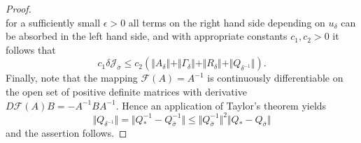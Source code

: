 \documentclass[10pt,a4paper]{amsart}
\begin{document}
\begin{proof}
\begin{equation*}
    \end{equation*}
    for a sufficiently small $\epsilon > 0$ all terms on the right hand side depending on $u_\delta$ can be absorbed in the left hand side, and with appropriate constants $c_1, c_2 > 0$ it follows that 
    \begin{equation*}
        c_1 \delta \mathcal{J}_{\bar{\sigma}}
        \leq 
        c_2 \left( 
        \Vert A_\delta \Vert + \Vert \Gamma_\delta \Vert + \Vert R_\delta \Vert + \Vert Q_{\delta^{-1}} \Vert
        \right).
    \end{equation*}
    Finally, note that the mapping $ \mathcal{F} (A) = A^{-1}$ is continuously differentiable on
    the open set of positive definite matrices with derivative $D\mathcal{F}(A)B = - A^{-1}B A^{-1}$. Hence an application of Taylor's theorem yields
    \begin{equation*}
        \Vert Q_{\delta^{-1}} \Vert
        =
        \Vert Q_*^{-1} - Q_{\bar{\sigma}}^{-1} \Vert
        \leq 
        \Vert Q_{\bar{\sigma}}^{-1} \Vert^2 \Vert Q_* - Q_{\bar{\sigma}} \Vert
    \end{equation*}
    and the assertion follows.
\end{proof}
\end{document}
